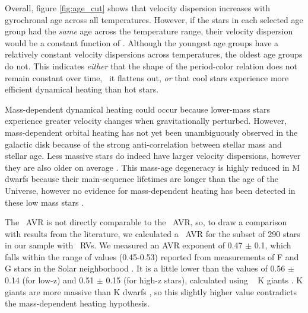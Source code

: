 Overall, figure \ref{fig:age_cut} shows that velocity dispersion increases
with gyrochronal age across all temperatures.
However, if the stars in each selected age group had the {\it same} age across
the temperature range, their velocity dispersion would be a constant function
of \teff.
Although the youngest age groups have a relatively constant velocity
dispersions across temperatures, the oldest age groups do not.
This indicates {\it either} that the shape of the period-color relation does
not remain constant over time, \ie\ it flattens out, {\it or} that cool stars
experience more efficient dynamical heating than hot stars.

Mass-dependent dynamical heating could occur because lower-mass stars
experience greater velocity changes when gravitationally perturbed.
However, mass-dependent orbital heating has not yet been unambiguously
observed in the galactic disk because of the strong anti-correlation between
stellar mass and stellar age.
Less massive stars do indeed have larger velocity dispersions, however they
are also older on average .
This mass-age degeneracy is highly reduced in M dwarfs because their
main-sequence lifetimes are longer than the age of the Universe, however no
evidence for mass-dependent heating has been detected in these low mass stars
\citep{faherty2009}.

The \vb\ AVR is not directly comparable to the \vz\ AVR, so, to draw a
comparison with results from the literature, we calculated a \vz\ AVR for
the subset of 290 stars in our sample with \gaia\ RVs.
We measured an AVR exponent of 0.47 $\pm$ 0.1, which falls within the range of
values (0.45-0.53) reported from measurements of F and G stars in the Solar
neighborhood \citep{holmberg2009, aumer2009, aumer2016}.
It is a little lower than the values of 0.56 $\pm$ 0.14 (for low-z) and 0.51
$\pm$ 0.15 (for high-z stars), calculated using \LAMOST\  K giants \citep{yu2018}.
K giants are more massive than K dwarfs ,
so this slightly higher value contradicts the mass-dependent heating
hypothesis.

